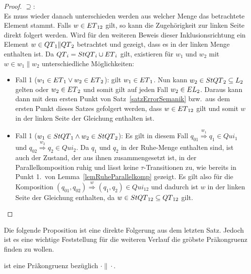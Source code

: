 \begin{proof}
  \glqq $\supseteq$\grqq :\\
  Es muss wieder danach unterschieden werden aus welcher Menge das betrachtete
  Element stammt. Falls $w\in ET{}_{12}$ gilt, so kann die
  Zugehörigkeit zur linken Seite direkt folgert werden. Wird für den
  weiteren Beweis dieser Inklusionsrichtung ein Element $w\in QT{}_1\|QT{}_2$
  betrachtet und gezeigt, dass es in der linken Menge enthalten ist. Da
  $QT{}_i = StQT{}_i\cup ET{}_i$ gilt, existieren für $w_1$ und $w_2$ mit
  $w\in w_1\| w_2$ unterschiedliche Möglichkeiten:
  \begin{itemize}
    \item Fall 1 ($w_1\in ET{}_1\vee w_2\in ET{}_2$): \OBdA{} gilt
      $w_1\in ET{}_1$. Nun kann $w_2\in StQT{}_2\subseteq L_2$ gelten
      oder $w_2\in ET{}_2$ und somit gilt auf jeden Fall $w_2\in
      EL{}_2$. Daraus kann dann mit dem ersten Punkt von
      Satz~\ref{satzErrorSemanik} bzw.\ aus dem ersten Punkt dieses Satzes
      gefolgert werden, dass $w\in ET{}_{12}$ gilt und somit $w$ in der linken
      Seite der Gleichung enthalten ist.
    \item Fall 1 ($w_1\in StQT{}_1\wedge w_2\in StQT{}_2$): Es gilt in
      diesem Fall $q_{01} \overset{w_1}{\Rightarrow} q_1\in Qui_1$ und $q_{02}
      \overset{w_2}{\Rightarrow} q_2\in Qui_2$. Da $q_1$ und $q_2$ in der
      Ruhe-Menge enthalten sind, ist auch der Zustand, der aus ihnen
      zusammengesetzt ist, in der Parallelkomposition ruhig und lässt keine
      $\tau$-Transitionen zu, wie bereits in Punkt 1.\ von
      Lemma~\ref{lemRuheParallelkomp} gezeigt. Es gilt also für die Komposition
      $(q_{01},q_{02}) \overset{w}{\Rightarrow} (q_1,q_2)\in Qui_{12}$ und
      dadurch ist $w$ in der linken Seite der Gleichung enthalten, da $w\in
      StQT{}_{12}\subseteq QT{}_{12}$ gilt.
  \end{itemize}
\end{proof}

Die folgende Proposition ist eine direkte Folgerung aus dem letzten Satz.
Jedoch ist es eine wichtige Feststellung für die weiteren Verlauf die gröbste
Präkongruenz finden zu wollen.

\begin{prop}[Präkongruenz]
  \label{propQuiPrae}
  \QRel{} ist eine Präkongruenz bezüglich $\cdot\|\cdot$.
\end{prop}

